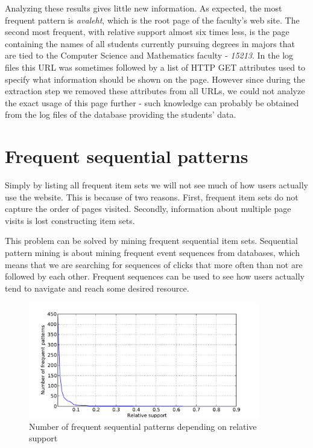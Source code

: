 \documentclass[12pt, english,a4paper]{article}
\begin{document}
Analyzing these results gives little new information. As expected, the most frequent pattern is \emph{avaleht}, which is the root page of the faculty's web site. The second most frequent, with relative support almost six times less, is the page containing the names of all students currently pursuing degrees in majors that are tied to the Computer Science and Mathematics faculty - \emph{15213}. In the log files this URL was sometimes followed by a list of HTTP GET attributes used to specify what information should be shown on the page. However since during the extraction step we removed these attributes from all URLs, we could not analyze the exact usage of this page further - such knowledge can probably be obtained from the log files of the database providing the students' data.


\section{Frequent sequential patterns}
Simply by listing all frequent item sets we will not see much of how users actually use the website. This is because of two reasons. First, frequent item sets do not capture the order of pages visited. Secondly, information about multiple page visits is lost constructing item sets.

This problem can be solved by mining frequent sequential item sets. Sequential pattern mining is about mining frequent event sequences from databases, which means that we are searching for sequences of clicks that more often than not are followed by each other. Frequent sequences can be used to see how users actually tend to navigate and reach some desired resource.

\begin{figure}[H]
  \centering
      \includegraphics[width=0.9\textwidth]{sequential_itemset_count}
  \caption{Number of frequent sequential patterns depending on relative support}
\end{figure}
\end{document}
